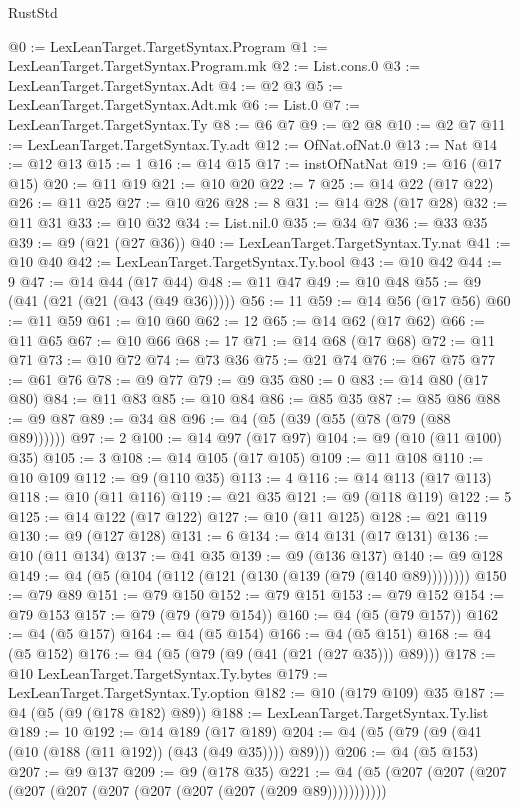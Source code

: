 \begin{lexlean}{RustStd}
\begin{coremodule}
{\begin{coremodule}
{{{{{{{{{{@0 := LexLeanTarget.TargetSyntax.Program
@1 := LexLeanTarget.TargetSyntax.Program.mk
@2 := List.cons.{0}
@3 := LexLeanTarget.TargetSyntax.Adt
@4 := @2 @3
@5 := LexLeanTarget.TargetSyntax.Adt.mk
@6 := List.{0}
@7 := LexLeanTarget.TargetSyntax.Ty
@8 := @6 @7
@9 := @2 @8
@10 := @2 @7
@11 := LexLeanTarget.TargetSyntax.Ty.adt
@12 := OfNat.ofNat.{0}
@13 := Nat
@14 := @12 @13
@15 := 1
@16 := @14 @15
@17 := instOfNatNat
@19 := @16 (@17 @15)
@20 := @11 @19
@21 := @10 @20
@22 := 7
@25 := @14 @22 (@17 @22)
@26 := @11 @25
@27 := @10 @26
@28 := 8
@31 := @14 @28 (@17 @28)
@32 := @11 @31
@33 := @10 @32
@34 := List.nil.{0}
@35 := @34 @7
@36 := @33 @35
@39 := @9 (@21 (@27 @36))
@40 := LexLeanTarget.TargetSyntax.Ty.nat
@41 := @10 @40
@42 := LexLeanTarget.TargetSyntax.Ty.bool
@43 := @10 @42
@44 := 9
@47 := @14 @44 (@17 @44)
@48 := @11 @47
@49 := @10 @48
@55 := @9 (@41 (@21 (@21 (@43 (@49 @36)))))
@56 := 11
@59 := @14 @56 (@17 @56)
@60 := @11 @59
@61 := @10 @60
@62 := 12
@65 := @14 @62 (@17 @62)
@66 := @11 @65
@67 := @10 @66
@68 := 17
@71 := @14 @68 (@17 @68)
@72 := @11 @71
@73 := @10 @72
@74 := @73 @36
@75 := @21 @74
@76 := @67 @75
@77 := @61 @76
@78 := @9 @77
@79 := @9 @35
@80 := 0
@83 := @14 @80 (@17 @80)
@84 := @11 @83
@85 := @10 @84
@86 := @85 @35
@87 := @85 @86
@88 := @9 @87
@89 := @34 @8
@96 := @4 (@5 (@39 (@55 (@78 (@79 (@88 @89))))))
@97 := 2
@100 := @14 @97 (@17 @97)
@104 := @9 (@10 (@11 @100) @35)
@105 := 3
@108 := @14 @105 (@17 @105)
@109 := @11 @108
@110 := @10 @109
@112 := @9 (@110 @35)
@113 := 4
@116 := @14 @113 (@17 @113)
@118 := @10 (@11 @116)
@119 := @21 @35
@121 := @9 (@118 @119)
@122 := 5
@125 := @14 @122 (@17 @122)
@127 := @10 (@11 @125)
@128 := @21 @119
@130 := @9 (@127 @128)
@131 := 6
@134 := @14 @131 (@17 @131)
@136 := @10 (@11 @134)
@137 := @41 @35
@139 := @9 (@136 @137)
@140 := @9 @128
@149 := @4 (@5 (@104 (@112 (@121 (@130 (@139 (@79 (@140 @89))))))))
@150 := @79 @89
@151 := @79 @150
@152 := @79 @151
@153 := @79 @152
@154 := @79 @153
@157 := @79 (@79 (@79 @154))
@160 := @4 (@5 (@79 @157))
@162 := @4 (@5 @157)
@164 := @4 (@5 @154)
@166 := @4 (@5 @151)
@168 := @4 (@5 @152)
@176 := @4 (@5 (@79 (@9 (@41 (@21 (@27 @35))) @89)))
@178 := @10 LexLeanTarget.TargetSyntax.Ty.bytes
@179 := LexLeanTarget.TargetSyntax.Ty.option
@182 := @10 (@179 @109) @35
@187 := @4 (@5 (@9 (@178 @182) @89))
@188 := LexLeanTarget.TargetSyntax.Ty.list
@189 := 10
@192 := @14 @189 (@17 @189)
@204 := @4 (@5 (@79 (@9 (@41 (@10 (@188 (@11 @192)) (@43 (@49 @35)))) @89)))
@206 := @4 (@5 @153)
@207 := @9 @137
@209 := @9 (@178 @35)
@221 := @4 (@5 (@207 (@207 (@207 (@207 (@207 (@207 (@207 (@207 (@207 (@209 @89)))))))))))
}}}}}}}}}}
\end{coremodule}}
\end{coremodule}
\end{lexlean}
